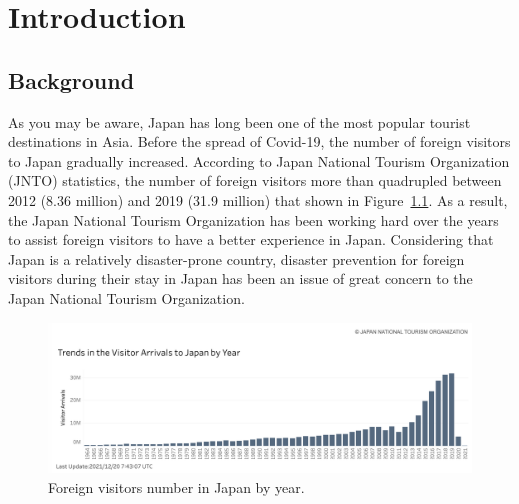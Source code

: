 \chapter{Introduction}

\section{Background}
As you may be aware, Japan has long been one of the most popular tourist destinations in Asia. Before the spread of Covid-19, the number of foreign visitors to Japan gradually increased. According to Japan National Tourism Organization (JNTO) statistics, the number of foreign visitors more than quadrupled between 2012 (8.36 million) and 2019 (31.9 million) that shown in Figure~\ref{fig1}. As a result, the Japan National Tourism Organization has been working hard over the years to assist foreign visitors to have a better experience in Japan. Considering that Japan is a relatively disaster-prone country, disaster prevention for foreign visitors during their stay in Japan has been an issue of great concern to the Japan National Tourism Organization.

\begin{figure}[h]
  \includegraphics[width=\linewidth]{Figure/Figure1.png}
  \centering
  \caption[Foreign visitors number in Japan by year.]{Foreign visitors number in Japan by year.\protect\footnotemark }
  \label{fig1}
\end{figure}

